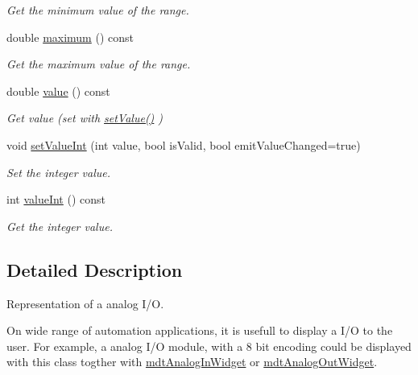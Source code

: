 \begin{DoxyCompactItemize}
\begin{DoxyCompactList}\small\item\em Get the minimum value of the range. \end{DoxyCompactList}\item 
\hypertarget{classmdt_analog_io_a61e312bc7921a6ca097ea6babf3281a5}{
double \hyperlink{classmdt_analog_io_a61e312bc7921a6ca097ea6babf3281a5}{maximum} () const }
\label{classmdt_analog_io_a61e312bc7921a6ca097ea6babf3281a5}

\begin{DoxyCompactList}\small\item\em Get the maximum value of the range. \end{DoxyCompactList}\item 
\hypertarget{classmdt_analog_io_a55d3e346dd13a580dc4ac77e8e946b01}{
double \hyperlink{classmdt_analog_io_a55d3e346dd13a580dc4ac77e8e946b01}{value} () const }
\label{classmdt_analog_io_a55d3e346dd13a580dc4ac77e8e946b01}

\begin{DoxyCompactList}\small\item\em Get value (set with \hyperlink{classmdt_analog_io_ac83abbda2bafce5c02e3ae1dbc5e2555}{setValue()} ) \end{DoxyCompactList}\item 
void \hyperlink{classmdt_analog_io_a011fba645b655bdb3f7f8740c327e624}{setValueInt} (int value, bool isValid, bool emitValueChanged=true)
\begin{DoxyCompactList}\small\item\em Set the integer value. \end{DoxyCompactList}\item 
int \hyperlink{classmdt_analog_io_a7594e94e059dd3b1db9d8277c7426fb2}{valueInt} () const 
\begin{DoxyCompactList}\small\item\em Get the integer value. \end{DoxyCompactList}\end{DoxyCompactItemize}


\subsection{Detailed Description}
Representation of a analog I/O. 

On wide range of automation applications, it is usefull to display a I/O to the user. For example, a analog I/O module, with a 8 bit encoding could be displayed with this class togther with \hyperlink{classmdt_analog_in_widget}{mdtAnalogInWidget} or \hyperlink{classmdt_analog_out_widget}{mdtAnalogOutWidget}. 

